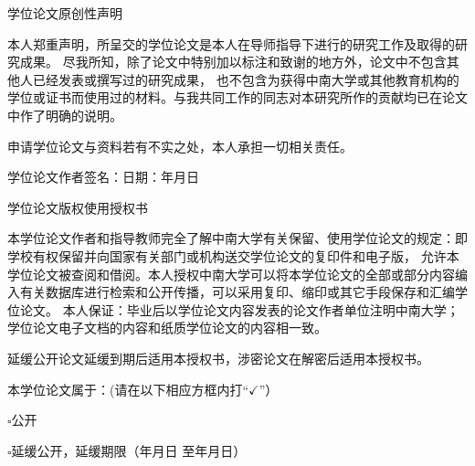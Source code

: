\thispagestyle{empty}  %
\phantom{空一行}
\begin{center}
    {\hwxw {} 学位论文原创性声明}
\end{center}

    本人郑重声明，所呈交的学位论文是本人在导师指导下进行的研究工作及取得的研究成果。
尽我所知，除了论文中特别加以标注和致谢的地方外，论文中不包含其他人已经发表或撰写过的研究成果，
也不包含为获得中南大学或其他教育机构的学位或证书而使用过的材料。与我共同工作的同志对本研究所作的贡献均已在论文中作了明确的说明。

    申请学位论文与资料若有不实之处，本人承担一切相关责任。

\vspace{1em}

    学位论文作者签名：\underline{\hspace{7em}}\hspace{2em}日期：\underline{\hspace{4.5em}}年\underline{\hspace{2.5em}}月\underline{\hspace{2.5em}}日

\vspace{3em}
\begin{center}
    {\hwxw {} 学位论文版权使用授权书}
\end{center}

    本学位论文作者和指导教师完全了解中南大学有关保留、使用学位论文的规定：即学校有权保留并向国家有关部门或机构送交学位论文的复印件和电子版，
允许本学位论文被查阅和借阅。本人授权中南大学可以将本学位论文的全部或部分内容编入有关数据库进行检索和公开传播，可以采用复印、缩印或其它手段保存和汇编学位论文。
本人保证：毕业后以学位论文内容发表的论文作者单位注明中南大学；学位论文电子文档的内容和纸质学位论文的内容相一致。

    延缓公开论文延缓到期后适用本授权书，涉密论文在解密后适用本授权书。

\vspace{1em}

    本学位论文属于：(请在以下相应方框内打“$\checkmark$”）

    $\square$公开

    $\square$延缓公开，延缓期限（\underline{\hspace{3.5em}}年\underline{\hspace{2em}}月\underline{\hspace{2em}}日
    至\underline{\hspace{3.5em}}年\underline{\hspace{2em}}月\underline{\hspace{2em}}日）



